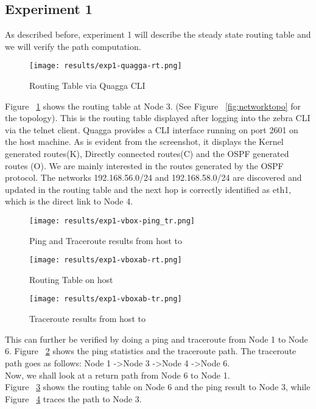 \documentclass{article}
\begin{document}
\subsection{Experiment 1}
As described before, experiment 1 will describe the steady state routing table and we will verify the path
computation.\\
\begin{figure}[ht!]
  \centering
  \texttt{[image: results/exp1-quagga-rt.png]}
  \caption{Routing Table via Quagga CLI}
  \label{fig:exp1-quagga-rt}
\end{figure}
Figure~ \ref{fig:exp1-quagga-rt} shows the routing table at Node 3. (See Figure~ \ref{fig:networktopo} for the topology).
This is the routing table displayed after logging into the zebra CLI via the telnet client.
Quagga provides a CLI interface running on port 2601 on the host machine.
As is evident from the screenshot, it displays the Kernel generated routes(K), Directly connected routes(C)
and the OSPF generated routes (O). We are mainly interested in the routes generated by the OSPF protocol.
The networks 192.168.56.0/24 and 192.168.58.0/24 are discovered and updated in the routing table and the 
next hop is correctly identified as eth1, which is the direct link to Node 4.\\
\begin{figure}[ht!]
  \centering
  \texttt{[image: results/exp1-vbox-ping\_tr.png]}
  \caption{Ping and Traceroute results from host to}
  \label{fig:exp1-vbox-ping_tr}
\end{figure}
\begin{figure}[ht!]
  \centering
  \texttt{[image: results/exp1-vboxab-rt.png]}
  \caption{Routing Table on host}
  \label{fig:exp1-vboxab-rt}
\end{figure}
\begin{figure}[ht!]
  \centering
  \texttt{[image: results/exp1-vboxab-tr.png]}
  \caption{Traceroute results from host to }
  \label{fig:exp1-vboxab-tr}
\end{figure}
This can further be verified by doing a ping and traceroute from Node 1 to Node 6. 
Figure~ \ref{fig:exp1-vbox-ping_tr} shows the ping statistics and the traceroute path. The traceroute 
path goes as follows: Node 1 -\textgreater Node 3 -\textgreater  Node 4 -\textgreater  Node 6.\\
Now, we shall look at a return path from Node 6 to Node 1.\\
Figure~ \ref{fig:exp1-vboxab-rt} shows the routing table on Node 6 and the ping result to Node 3,
while Figure~ \ref{fig:exp1-vboxab-tr} traces the path to Node 3.
\end{document}

